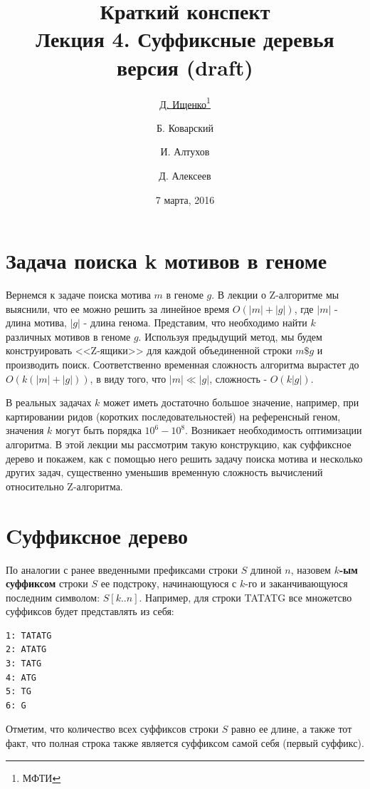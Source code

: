 \documentclass[letterpaper, 11pt]{article}
\title{\large{Краткий конспект}\\
\LARGE{Лекция 4. Суффиксные деревья}\\
\normalsize версия \versionnumber (\textcolor{NavyBlue}{draft})}
\date{7 марта, 2016}
\author{\underline{Д. Ищенко\thanks{МФТИ}} \and Б. Коварский\footnotemark[1]
\and И. Алтухов\footnotemark[1] \and Д. Алексеев\footnotemark[1]}
\begin{document}
\maketitle
\thispagestyle{empty}
\clearpage

\section{Задача поиска k мотивов в геноме}

Вернемся к задаче поиска мотива $m$ в геноме $g$. В лекции о Z-алгоритме мы выяснили, что ее можно решить за линейное время $O(|m| + |g|)$, где $|m|$ - длина мотива, $|g|$ - длина генома. Представим, что необходимо найти $k$ различных мотивов в геноме $g$. Используя предыдущий метод, мы будем конструировать <<Z-ящики>> для каждой объединенной строки $m\$g$ и производить поиск. Соответственно временная сложность алгоритма вырастет до $O(k(|m| + |g|))$, в виду того, что $|m| \ll |g|$, сложность - $O(k|g|)$.

В реальных задачах $k$ может иметь достаточно большое значение, например, при картировании ридов (коротких последовательностей) на референсный геном, значения $k$ могут быть порядка $10^6 - 10^8$. Возникает необходимость оптимизации алгоритма. В этой лекции мы рассмотрим такую конструкцию, как суффиксное дерево и покажем, как с помощью него решить задачу поиска мотива и несколько других задач, существенно уменьшив временную сложность вычислений относительно Z-алгоритма.

\section{Cуффиксное дерево}

По аналогии с ранее введенными префиксами строки $S$ длиной $n$, назовем \textbf{$k$-ым суффиксом} строки $S$ ее подстроку, начинающуюся с $k$-го и заканчивающуюся последним символом: $S[k..n]$. Например, для строки TATATG все множетсво суффиксов будет представлять из себя:
\begin{verbatim}
1: TATATG
2: ATATG
3: TATG
4: ATG
5: TG
6: G
\end{verbatim}

Отметим, что количество всех суффиксов строки $S$ равно ее длине, а также тот факт, что полная строка также является суффиксом самой себя (первый суффикс).
\end{document}
